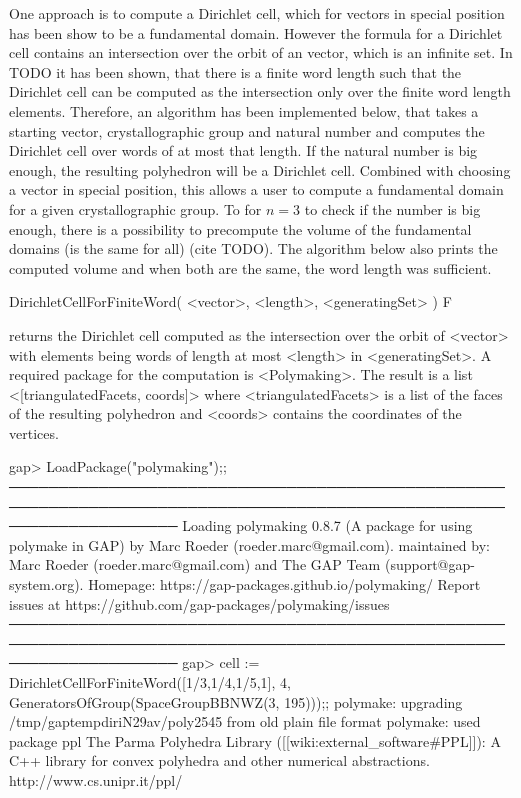 One approach is to compute a Dirichlet cell, which for vectors in special position has been show to be a fundamental domain. However the formula for a Dirichlet cell contains an intersection over the orbit of an vector, which is an infinite set. In TODO it has been shown, that there is a finite word length such that the Dirichlet cell can be computed as the intersection only over the finite word length elements. Therefore, an algorithm has been implemented below, that takes a starting vector, crystallographic group and natural number and computes the Dirichlet cell over words of at most that length. If the natural number is big enough, the resulting polyhedron will be a Dirichlet cell. Combined with choosing a vector in special position, this allows a user to compute a fundamental domain for a given crystallographic group.
To for $n=3$ to check if the number is big enough, there is a possibility to precompute the volume of the fundamental domains (is the same for all) (cite TODO). The algorithm below also prints the computed volume and when both are the same, the word length was sufficient. 

\> DirichletCellForFiniteWord( <vector>, <length>, <generatingSet> ) F

returns the Dirichlet cell computed as the intersection over the orbit of <vector> with elements being words of length at most <length> in <generatingSet>.
A required package for the computation is <Polymaking>. 
The result is a list <[triangulatedFacets, coords]> where <triangulatedFacets> is a list of the faces of the resulting polyhedron and <coords> contains the coordinates of the vertices. 

\beginexample
gap> LoadPackage("polymaking");;
─────────────────────────────────────────────────────────────────────────────────────────────────────────────────────
Loading polymaking 0.8.7 (A package for using polymake in GAP)
by Marc Roeder (roeder.marc@gmail.com).
maintained by:
   Marc Roeder (roeder.marc@gmail.com) and
   The GAP Team (support@gap-system.org).
Homepage: https://gap-packages.github.io/polymaking/
Report issues at https://github.com/gap-packages/polymaking/issues
─────────────────────────────────────────────────────────────────────────────────────────────────────────────────────
gap> cell := DirichletCellForFiniteWord([1/3,1/4,1/5,1], 4, 
                                        GeneratorsOfGroup(SpaceGroupBBNWZ(3, 195)));;
polymake: upgrading /tmp/gaptempdiriN29av/poly2545 from old plain file format
polymake: used package ppl
  The Parma Polyhedra Library ([[wiki:external_software#PPL]]): A C++ library for 
  convex polyhedra and other numerical abstractions.
  http://www.cs.unipr.it/ppl/
\endexample

